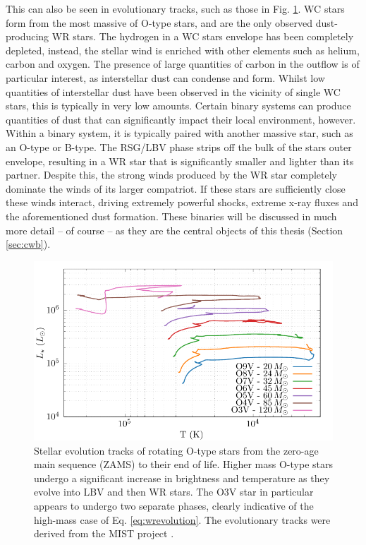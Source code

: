 \noindent
This can also be seen in evolutionary tracks, such as those in Fig. \ref{fig:mist-zams}.
WC stars form from the most massive of O-type stars, and are the only observed dust-producing WR stars.
The hydrogen in a WC stars envelope has been completely depleted, instead, the stellar wind is enriched with other elements such as helium, carbon and oxygen.
The presence of large quantities of carbon in the outflow is of particular interest, as interstellar dust can condense and form.
Whilst low quantities of interstellar dust have been observed in the vicinity of single WC stars, this is typically in very low amounts.
Certain binary systems can produce quantities of dust that can significantly impact their local environment, however.
Within a binary system, it is typically paired with another massive star, such as an O-type or B-type.
The RSG/LBV phase strips off the bulk of the stars outer envelope, resulting in a WR star that is significantly smaller and lighter than its partner.
Despite this, the strong winds produced by the WR star completely dominate the winds of its larger compatriot.
If these stars are sufficiently close these winds interact, driving extremely powerful shocks, extreme x-ray fluxes and the aforementioned dust formation.
These binaries will be discussed in much more detail -- of course -- as they are the central objects of this thesis (Section \ref{sec:cwb}).

\begin{figure}[ht]
  \centering
  \includegraphics{assets/tracks/tracks.pdf}
  \caption[Stellar evolution tracks of massive stars]{Stellar evolution tracks of rotating O-type stars from the zero-age main sequence (ZAMS) to their end of life. Higher mass O-type stars undergo a significant increase in brightness and temperature as they evolve into LBV and then WR stars. The O3V star in particular appears to undergo two separate phases, clearly indicative of the high-mass case of Eq. \ref{eq:wrevolution}. The evolutionary tracks were derived from the MIST project \parencite{choiMesaIsochronesStellar2016,dotterMESAIsochronesStellar2016,paxtonModulesExperimentsStellar2011}.}
  \label{fig:mist-zams}
\end{figure}

